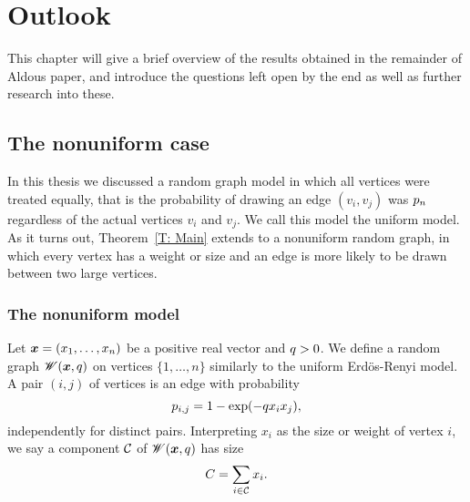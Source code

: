 
\chapter{Outlook} \label{C: outlook}

This chapter will give a brief overview of the results obtained in the remainder of Aldous paper,
and introduce the questions left open by the end as well as further research into these.

\section{The nonuniform case}

In this thesis we discussed a random graph model in which all vertices were treated equally,
that is the probability of drawing an edge $(v_i,v_j)$ was $p_n$ regardless of the actual vertices $v_i$ and $v_j$.
We call this model the uniform model.
As it turns out, Theorem~\ref{T: Main} extends to a nonuniform random graph,
in which every vertex has a weight or size and an edge is more likely to be drawn between two large vertices.

\subsection{The nonuniform model}
Let $\boldsymbol{x} = (x_1, \dots, x_n)$ be a positive real vector and $q > 0$.
We define a random graph $\mathscr{W}(\boldsymbol{x}, q)$ on vertices $\{1, \dots, n\}$ similarly to the uniform Erdös-Renyi model.
A pair $(i, j)$ of vertices is an edge with probability
\begin{equation}
	p_{i,j} = 1 - \exp(-q x_i x_j),
\end{equation}
independently for distinct pairs.
Interpreting $x_i$ as the size or weight of vertex $i$, we say a component $\mathcal{C}$ of $\mathscr{W}(\boldsymbol{x}, q)$ has size
\begin{equation}
	C = \sum_{i \in \mathcal{C}} x_i.
\end{equation}

